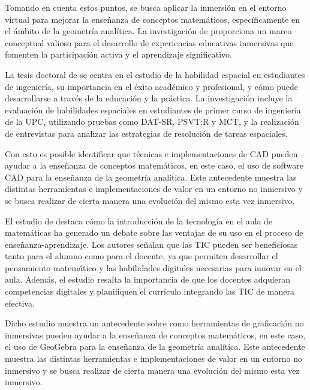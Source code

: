 Tomando en cuenta estos puntos, se busca aplicar la inmersión en el entorno virtual para mejorar la enseñanza de conceptos matemáticos, específicamente en el ámbito de la geometría analítica. La investigación de \citeauthor{dede2009immersive} proporciona un marco conceptual valioso para el desarrollo de experiencias educativas inmersivas que fomenten la participación activa y el aprendizaje significativo.

La tesis doctoral de \citeauthor{tristancho2019desarrollo} \citeyear{tristancho2019desarrollo} se centra en el estudio de la habilidad espacial en estudiantes de ingeniería, su importancia en el éxito académico y profesional, y cómo puede desarrollarse a través de la educación y la práctica. La investigación incluye la evaluación de habilidades espaciales en estudiantes de primer curso de ingeniería de la UPC, utilizando pruebas como DAT-SR, PSVT:R y MCT, y la realización de entrevistas para analizar las estrategias de resolución de tareas espaciales.

Con esto es posible identificar que técnicas e implementaciones de CAD pueden ayudar a la enseñanza de conceptos matemáticos, en este caso, el uso de software CAD para la enseñanza de la geometría analítica. Este antecedente muestra las distintas herramientas e implementaciones de valor en un entorno no inmersivo y se busca realizar de cierta manera una evolución del mismo esta vez inmersivo.

El estudio de \citeauthor{garcia2017geogebra} \citeyear{garcia2017geogebra} destaca cómo la introducción de la tecnología en el aula de matemáticas ha generado un debate sobre las ventajas de su uso en el proceso de enseñanza-aprendizaje. Los autores señalan que las TIC pueden ser beneficiosas tanto para el alumno como para el docente, ya que permiten desarrollar el pensamiento matemático y las habilidades digitales necesarias para innovar en el aula. Además, el estudio resalta la importancia de que los docentes adquieran competencias digitales y planifiquen el currículo integrando las TIC de manera efectiva.

Dicho estudio muestra un antecedente sobre como herramientas de graficación no inmersivas pueden ayudar a la enseñanza de conceptos matemáticos, en este caso, el uso de GeoGebra para la enseñanza de la geometría analítica. Este antecedente muestra las distintas herramientas e implementaciones de valor en un entorno no inmersivo y se busca realizar de cierta manera una evolución del mismo esta vez inmersivo.

